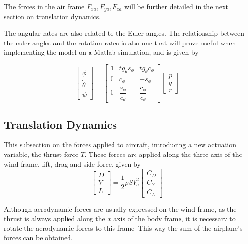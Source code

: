 The forces in the air frame $F_{xa}, F_{ya}, F_{za}$ will be further detailed in the next section on translation dynamics. 

The angular rates are also related to the Euler angles. The relationship between the euler angles and the rotation rates is also one that will prove useful when implementing the model on a Matlab simulation, and is given by

\begin{equation}
\begin{bmatrix}
\dot{\phi}\\
\dot{\theta}\\
\dot{\psi}
\end{bmatrix}
=
\begin{bmatrix}
1 & tg_\theta s_\phi & tg_\theta c_\phi\\
0 & c_\phi & -s_\phi\\
0 & \dfrac{s_\phi}{c_\theta} & \dfrac{c_\phi}{c_\theta}
\end{bmatrix}
\begin{bmatrix}
p\\
q\\
r
\end{bmatrix}
\label{eq:euler2omega}
\end{equation}

\subsection{Translation Dynamics}
This subsection on the forces applied to aircraft, introducing a new actuation variable, the thrust force $T$. These forces are applied along the three axis of the wind frame, lift, drag and side force, given by
\begin{equation}
\begin{bmatrix}
D\\
Y\\
L
\end{bmatrix}
= \dfrac{1}{2} \rho SV_a^2
\begin{bmatrix}
C_D\\
C_Y\\
C_L
\end{bmatrix}
\label{eq:forces}
\end{equation}

Although aerodynamic forces are usually expressed on the wind frame, as the thrust is always applied along the $x$ axis of the body frame, it is necessary to rotate the aerodynamic forces to this frame. This way the sum of the airplane's forces can be obtained. 

